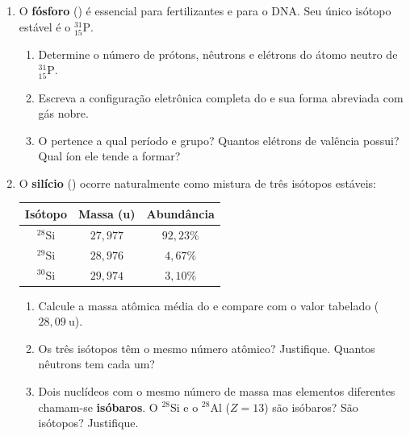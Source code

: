 \documentclass[10pt,a4paper]{article}
\begin{document}
\begin{enumerate}[resume]

\item O \textbf{fósforo} () é essencial para fertilizantes e
  para o DNA. Seu único isótopo estável é o ${}^{31}_{15}\text{P}$.
  \begin{enumerate}
    \item Determine o número de prótons, nêutrons e elétrons do
          átomo neutro de ${}^{31}_{15}\text{P}$.
    \item Escreva a configuração eletrônica completa do  e
          sua forma abreviada com gás nobre.
    \item O  pertence a qual período e grupo? Quantos
          elétrons de valência possui? Qual íon ele tende a formar?
  \end{enumerate}

\item O \textbf{silício} () ocorre naturalmente como mistura
  de três isótopos estáveis:

  \begin{center}
  \begin{tabular}{ccc}
    \toprule
    Isótopo & Massa (u) & Abundância \\
    \midrule
    ${}^{28}\text{Si}$ & $27{,}977$ & $92{,}23\%$ \\
    ${}^{29}\text{Si}$ & $28{,}976$ & $4{,}67\%$  \\
    ${}^{30}\text{Si}$ & $29{,}974$ & $3{,}10\%$  \\
    \bottomrule
  \end{tabular}
  \end{center}

  \begin{enumerate}
    \item Calcule a massa atômica média do  e compare
          com o valor tabelado ($28{,}09~\text{u}$).
    \item Os três isótopos têm o mesmo número atômico? Justifique.
          Quantos nêutrons tem cada um?
    \item Dois nuclídeos com o mesmo número de massa mas elementos
          diferentes chamam-se \textbf{isóbaros}. O ${}^{28}\text{Si}$
          e o ${}^{28}\text{Al}$ ($Z=13$) são isóbaros?
          São isótopos? Justifique.
  \end{enumerate}


\end{enumerate}
\end{document}
